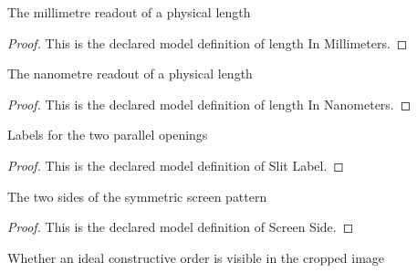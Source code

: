 \begin{definition}
  \label{def:physics:phyx-mini-0122:phyxminiproblems-problemphyxmini0122-lengthinmillimeters}
  The millimetre readout of a physical length
\end{definition}
\begin{proof}
  This is the declared model definition of length In Millimeters.
\end{proof}
\begin{definition}
  \label{def:physics:phyx-mini-0122:phyxminiproblems-problemphyxmini0122-lengthinnanometers}
  The nanometre readout of a physical length
\end{definition}
\begin{proof}
  This is the declared model definition of length In Nanometers.
\end{proof}
\begin{definition}
  \label{def:physics:phyx-mini-0122:phyxminiproblems-problemphyxmini0122-slitlabel}
  Labels for the two parallel openings
\end{definition}
\begin{proof}
  This is the declared model definition of Slit Label.
\end{proof}
\begin{definition}
  \label{def:physics:phyx-mini-0122:phyxminiproblems-problemphyxmini0122-screenside}
  The two sides of the symmetric screen pattern
\end{definition}
\begin{proof}
  This is the declared model definition of Screen Side.
\end{proof}
\begin{definition}
  \label{def:physics:phyx-mini-0122:phyxminiproblems-problemphyxmini0122-spotvisibility}
  Whether an ideal constructive order is visible in the cropped image
\end{definition}
